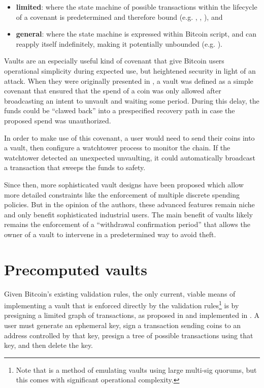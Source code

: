 \documentclass[10pt]{article}
\begin{document}
\begin{itemize}
  \item \textbf{limited}: where the state machine of possible transactions within the lifecycle
    of a covenant is predetermined and therefore bound (e.g. \cite{CTV}, \cite{APO},
    \cite{OPTX}), and

  \item \textbf{general}: where the state machine is expressed within Bitcoin script,
    and can reapply itself indefinitely, making it potentially unbounded (e.g. \cite{ElementsScript}).

\end{itemize}

Vaults are an especially useful kind of covenant that give Bitcoin users
operational simplicity during expected use, but heightened security in light of an
attack. When they were originally presented in \cite{Cov}, a vault was defined as a
simple covenant that ensured that the spend of a coin was only allowed after
broadcasting an intent to unvault and waiting some period. During this delay,
the funds could be ``clawed back'' into a prespecified recovery path in case the
proposed spend was unauthorized.

In order to make use of this covenant, a user would need to send their coins into a
vault, then configure a watchtower process to monitor the chain. If the watchtower
detected an unexpected unvaulting, it could automatically broadcast a transaction that
sweeps the funds to safety.

Since then, more sophisticated vault designs have been proposed which allow more
detailed constraints like the enforcement of multiple discrete spending
policies. But in the opinion of the authors, these advanced features remain niche and
only benefit sophisticated industrial users. The main benefit of vaults 
likely remains the enforcement of a ``withdrawal confirmation period'' that
allows the owner of a vault to intervene in a predetermined way to avoid theft.


\section*{Precomputed vaults}

Given Bitcoin's existing validation rules, the only current, viable means of
implementing a vault that is enforced directly by the validation rules\footnote{Note
that \cite{Revault} is a method of emulating vaults using large multi-sig quorums, but
this comes with significant operational complexity.} is by presigning a limited graph
of transactions, as proposed in \cite{Bishop} and implemented in \cite{BishopCode}. A user must generate an ephemeral key,
sign a transaction sending coins to an address controlled by that key, presign a
tree of possible transactions using that key, and then delete the key. 
\end{document}
